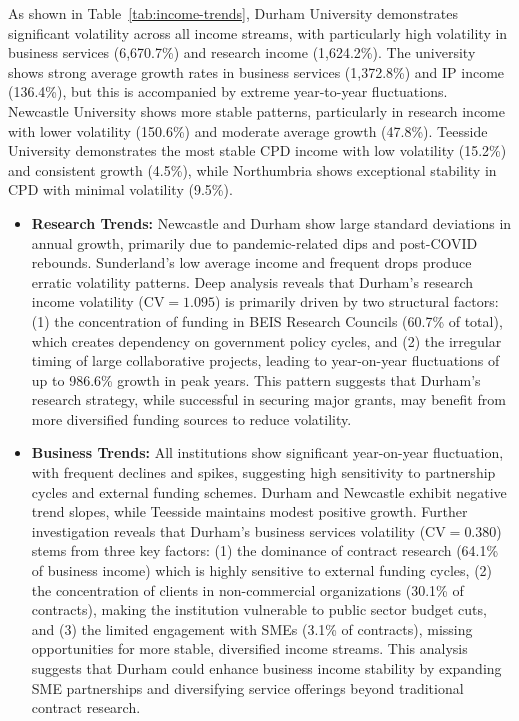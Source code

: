 \documentclass[journal,onecolumn, 10pt,draftclsnofoot]{IEEEtran}
\begin{document}
As shown in Table~\ref{tab:income-trends}, Durham University demonstrates significant volatility across all income streams, with particularly high volatility in business services (6,670.7\%) and research income (1,624.2\%). The university shows strong average growth rates in business services (1,372.8\%) and IP income (136.4\%), but this is accompanied by extreme year-to-year fluctuations. Newcastle University shows more stable patterns, particularly in research income with lower volatility (150.6\%) and moderate average growth (47.8\%). Teesside University demonstrates the most stable CPD income with low volatility (15.2\%) and consistent growth (4.5\%), while Northumbria shows exceptional stability in CPD with minimal volatility (9.5\%).

\begin{itemize}
    \item \textbf{Research Trends:} Newcastle and Durham show large standard deviations in annual growth, primarily due to pandemic-related dips and post-COVID rebounds. Sunderland's low average income and frequent drops produce erratic volatility patterns. Deep analysis reveals that Durham's research income volatility ($\mathrm{CV}=1.095$) is primarily driven by two structural factors: (1) the concentration of funding in BEIS Research Councils (60.7\% of total), which creates dependency on government policy cycles, and (2) the irregular timing of large collaborative projects, leading to year-on-year fluctuations of up to 986.6\% growth in peak years. This pattern suggests that Durham's research strategy, while successful in securing major grants, may benefit from more diversified funding sources to reduce volatility.
    
    \item \textbf{Business Trends:} All institutions show significant year-on-year fluctuation, with frequent declines and spikes, suggesting high sensitivity to partnership cycles and external funding schemes. Durham and Newcastle exhibit negative trend slopes, while Teesside maintains modest positive growth. Further investigation reveals that Durham's business services volatility ($\mathrm{CV}=0.380$) stems from three key factors: (1) the dominance of contract research (64.1\% of business income) which is highly sensitive to external funding cycles, (2) the concentration of clients in non-commercial organizations (30.1\% of contracts), making the institution vulnerable to public sector budget cuts, and (3) the limited engagement with SMEs (3.1\% of contracts), missing opportunities for more stable, diversified income streams. This analysis suggests that Durham could enhance business income stability by expanding SME partnerships and diversifying service offerings beyond traditional contract research.
    

\end{itemize}
\end{document}
